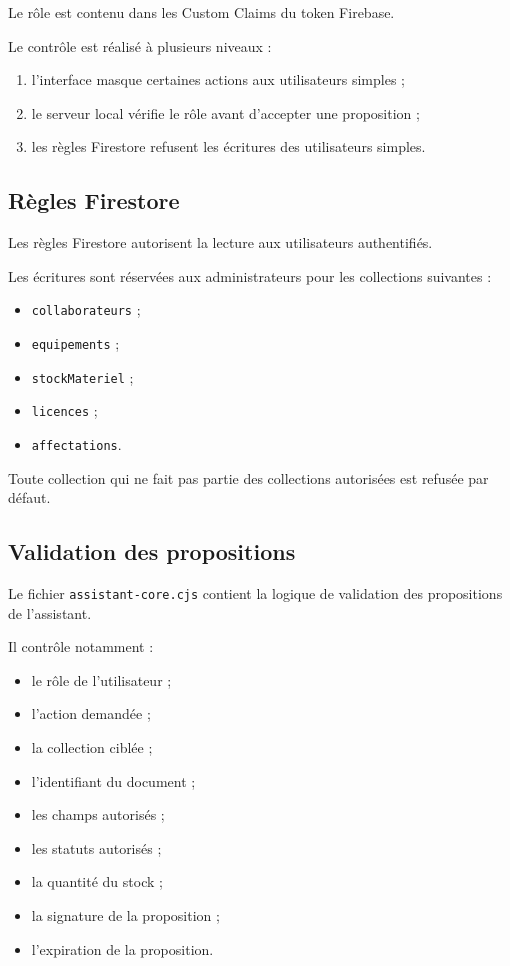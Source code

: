 \documentclass{rapportENSIAS}
\begin{document}
Le rôle est contenu dans les Custom Claims du token Firebase.

Le contrôle est réalisé à plusieurs niveaux :

\begin{enumerate}
    \item l’interface masque certaines actions aux utilisateurs simples ;
    \item le serveur local vérifie le rôle avant d’accepter une proposition ;
    \item les règles Firestore refusent les écritures des utilisateurs simples.
\end{enumerate}

\subsection{Règles Firestore}

Les règles Firestore autorisent la lecture aux utilisateurs authentifiés.

Les écritures sont réservées aux administrateurs pour les collections suivantes :

\begin{itemize}
    \item \texttt{collaborateurs} ;
    \item \texttt{equipements} ;
    \item \texttt{stockMateriel} ;
    \item \texttt{licences} ;
    \item \texttt{affectations}.
\end{itemize}

Toute collection qui ne fait pas partie des collections autorisées est refusée par défaut.

\subsection{Validation des propositions}

Le fichier \texttt{assistant-core.cjs} contient la logique de validation des propositions de l’assistant.

Il contrôle notamment :

\begin{itemize}
    \item le rôle de l’utilisateur ;
    \item l’action demandée ;
    \item la collection ciblée ;
    \item l’identifiant du document ;
    \item les champs autorisés ;
    \item les statuts autorisés ;
    \item la quantité du stock ;
    \item la signature de la proposition ;
    \item l’expiration de la proposition.
\end{itemize}
\end{document}
